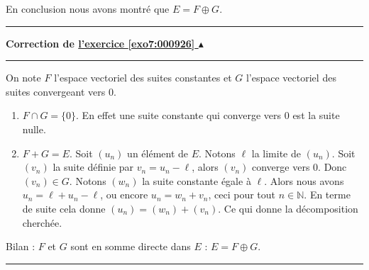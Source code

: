 \documentclass[11pt,a4paper]{article}
\newcommand{\Nn}{\mathbb{N}} \newcommand{\N}{\mathbb{N}}
\newcounter{exo}
\newcommand{\correction}[1]{\hypertarget{cor7:#1}{}\label{cor7:#1}{\bf Correction de \hyperlink{exo7:#1}{l'exercice \ref{exo7:#1} $\blacktriangle$}}\vspace{1mm}\hrule\vspace{1mm}}
\newcommand{\fincorrection}{\vspace{1mm}\hrule\vspace*{7mm}}
\begin{document}
  En conclusion nous avons montré que $E = F \oplus G$.
\fincorrection
\correction{000926}
 On note $F$ l'espace vectoriel des suites constantes et $G$ l'espace
  vectoriel des suites convergeant vers $0$.
\begin{enumerate}
\item $F\cap G = \{0\}$. En effet une suite constante qui converge
  vers $0$ est la suite nulle.
  \item $F+G=E$. Soit $(u_n)$ un \'el\'ement de $E$. Notons $\ell$ la
    limite de $(u_n)$.  Soit $(v_n)$ la suite d\'efinie par
    $v_n=u_n-\ell$, alors $(v_n)$ converge vers $0$. Donc $(v_n)\in
    G$.  Notons $(w_n)$ la suite constante \'egale \`a $\ell$. Alors nous
    avons $u_n=\ell+u_n-\ell$, ou encore $u_n=w_n+v_n$, ceci pour tout
    $n\in\Nn$. En terme de suite cela donne $(u_n)=(w_n)+(v_n)$. Ce
    qui donne la d\'ecomposition cherch\'ee.
\end{enumerate}
Bilan : $F$ et $G$ sont en somme directe dans $E$ : $E=F\oplus G$.
\fincorrection
\end{document}
